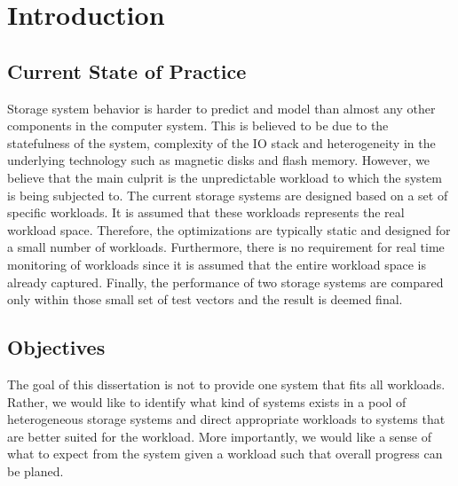 \chapter{Introduction}
\label{INTRO}


\section{Current State of Practice}
Storage system behavior is harder to predict and model than almost any other components in the computer system. 
This is believed to be due to the statefulness of the system, complexity of the IO stack and heterogeneity in the underlying technology such as magnetic disks and flash memory.
However, we believe that the main culprit is the unpredictable workload to which the system is being subjected to.
The current storage systems are designed based on a set of specific workloads. 
It is assumed that these workloads represents the real workload space.
Therefore, the optimizations are typically static and designed for a small number of workloads.
Furthermore, there is no requirement for real time monitoring of workloads since it is assumed that the entire workload space is already captured. 
Finally, the performance of two storage systems are compared only within those small set of test vectors and the result is deemed final. 

\section{Objectives}
The goal of this dissertation is not to provide one system that fits all workloads. 
Rather, we would like to identify what kind of systems exists in a pool of heterogeneous storage systems and direct appropriate workloads to systems that are better suited for the workload.
More importantly, we would like a sense of what to expect from the system given a workload such that overall progress can be planed. 
 
